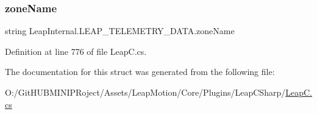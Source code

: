 \subsubsection{\texorpdfstring{zoneName}{zoneName}}
{\footnotesize\ttfamily string Leap\+Internal.\+L\+E\+A\+P\+\_\+\+T\+E\+L\+E\+M\+E\+T\+R\+Y\+\_\+\+D\+A\+T\+A.\+zone\+Name}



Definition at line 776 of file Leap\+C.\+cs.



The documentation for this struct was generated from the following file\+:\begin{DoxyCompactItemize}
\item 
O\+:/\+Git\+H\+U\+B\+M\+I\+N\+I\+P\+Roject/\+Assets/\+Leap\+Motion/\+Core/\+Plugins/\+Leap\+C\+Sharp/\mbox{\hyperlink{_leap_c_8cs}{Leap\+C.\+cs}}\end{DoxyCompactItemize}
